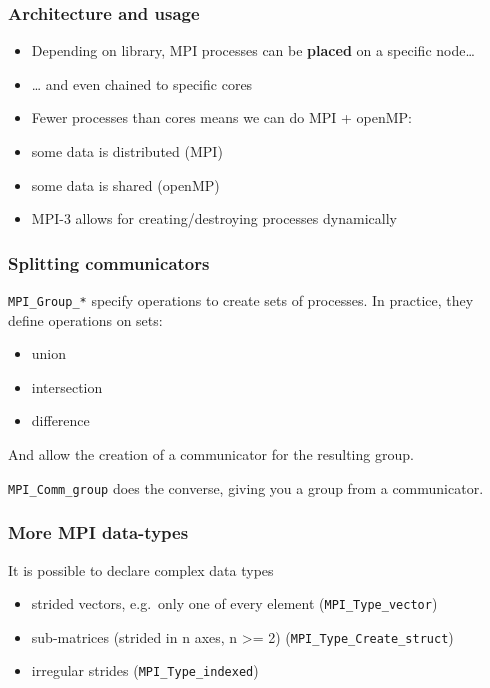 \subsubsection{Architecture and usage}\label{architecture-and-usage}

\begin{itemize}
\itemsep1pt\parskip0pt
\item
  Depending on library, MPI processes can be \textbf{placed} on a
  specific node\ldots{}
\item
  \ldots{} and even chained to specific cores
\item
  Fewer processes than cores means we can do MPI + openMP:
\item
  some data is distributed (MPI)
\item
  some data is shared (openMP)
\item
  MPI-3 allows for creating/destroying processes dynamically
\end{itemize}

\subsubsection{Splitting communicators}\label{splitting-communicators}

\texttt{MPI\_Group\_*} specify operations to create sets of processes.
In practice, they define operations on sets:

\begin{itemize}
\itemsep1pt\parskip0pt
\item
  union
\item
  intersection
\item
  difference
\end{itemize}

And allow the creation of a communicator for the resulting group.

\texttt{MPI\_Comm\_group} does the converse, giving you a group from a
communicator.

\subsubsection{More MPI data-types}\label{more-mpi-data-types}

It is possible to declare complex data types

\begin{itemize}
\itemsep1pt\parskip0pt
\item
  strided vectors, e.g.~only one of every element
  (\texttt{MPI\_Type\_vector})
\item
  sub-matrices (strided in n axes, n \textgreater{}= 2)
  (\texttt{MPI\_Type\_Create\_struct})
\item
  irregular strides (\texttt{MPI\_Type\_indexed})
\end{itemize}

